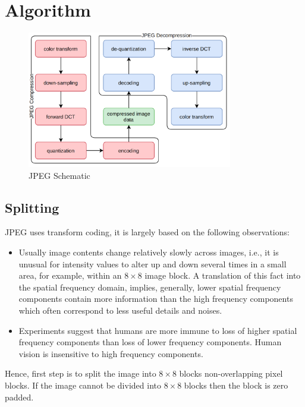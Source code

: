 \vspace{2em}

\section{Algorithm}

\begin{figure}[!ht]
    \centering
    \includegraphics[width=0.80\textwidth]{fig/3-2.png}
    \caption{JPEG Schematic}
    \label{fig:jpegSchematic}
\end{figure}


\subsection{Splitting}

JPEG uses transform coding, it is largely based on the following observations:

\begin{itemize}
    \item Usually image contents change relatively slowly across images, i.e., it is unusual for intensity values to alter up and down several times in a small area, for example, within an $8 \times 8$ image block. A translation of this fact into the spatial frequency domain, implies, generally, lower spatial  frequency components contain more information than the high frequency components which often correspond to less useful details and noises.
    \item Experiments suggest that humans are more immune to loss of higher spatial frequency components than loss of lower frequency components. Human vision is insensitive to high frequency components.
\end{itemize}

Hence, first step is to split the image into $8 \times 8$ blocks non-overlapping pixel blocks. If the image cannot be divided into $8 \times 8$ blocks then the block is zero padded.

